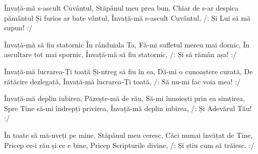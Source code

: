 \beginverse
Învață-mă s-ascult Cuvântul,
Stăpânul meu prea bun,
Chiar de s-ar despica pământul
Și furios ar bate vântul,
Învață-mă s-ascult Cuvântul,
/: Și Lui să mă supun! :/
\endverse

\beginverse
Învață-mă să fiu statornic
În rânduiala Ta,
Fă-mi sufletul mereu mai dornic,
În ascultare tot mai spornic,
Învață-mă să fiu statornic,
/: Și să rămân așa! :/
\endverse

\beginverse
Învață-mă lucrarea-Ți toată
Și-ntreg să fiu în ea,
Dă-mi o cunoaștere curată,
De rătăcire dezlegată,
Învață-mă lucrarea-Ți toată,
/: Să nu-mi fac voia mea! :/
\endverse

\beginverse
Învață-mă deplin iubirea,
Păzește-mă de rău,
Să-mi înnoiești prin ea simțirea,
Spre Tine să-mi îndrepți privirea,
Învață-mă deplin iubirea,
/: Și Adevărul Tău! :/
\endverse

\beginverse
În toate să mă-nveți pe mine,
Stăpânul meu ceresc,
Căci numai învățat de Tine,
Pricep ce-i rău și ce e bine,
Pricep Scripturile divine,
/: Și știu cum să trăiesc. :/
\endverse
\endsong